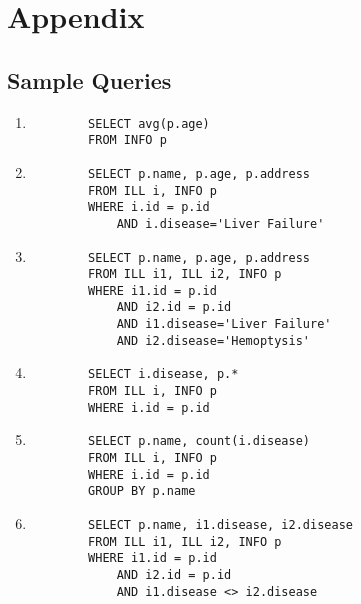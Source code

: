 
\section{Appendix}
\label{app}

\subsection{Sample Queries}
\label{app:queries}

\begin{enumerate}

    \item \begin{verbatim}
        SELECT avg(p.age)
        FROM INFO p
    \end{verbatim}

    \item \begin{verbatim}
        SELECT p.name, p.age, p.address 
        FROM ILL i, INFO p 
        WHERE i.id = p.id 
            AND i.disease='Liver Failure'
    \end{verbatim}
    
    \item \begin{verbatim}
        SELECT p.name, p.age, p.address 
        FROM ILL i1, ILL i2, INFO p 
        WHERE i1.id = p.id 
            AND i2.id = p.id 
            AND i1.disease='Liver Failure' 
            AND i2.disease='Hemoptysis'
    \end{verbatim}

    \item \begin{verbatim}
        SELECT i.disease, p.* 
        FROM ILL i, INFO p 
        WHERE i.id = p.id
    \end{verbatim}
   
    \item \begin{verbatim}
        SELECT p.name, count(i.disease) 
        FROM ILL i, INFO p 
        WHERE i.id = p.id 
        GROUP BY p.name 
    \end{verbatim}

    \item \begin{verbatim}
        SELECT p.name, i1.disease, i2.disease 
        FROM ILL i1, ILL i2, INFO p 
        WHERE i1.id = p.id 
            AND i2.id = p.id 
            AND i1.disease <> i2.disease
    \end{verbatim}


\end{enumerate}

